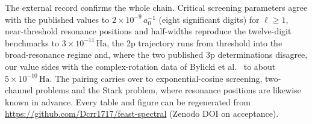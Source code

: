 \documentclass[12pt,twoside]{paper}
\newcommand{\Ha}{\,\mathrm{Ha}}
\begin{document}
The external record confirms the whole chain. Critical screening
parameters agree with the published values to $2\times10^{-9}\,a_0^{-1}$
(eight significant digits) for $\ell \ge 1$, near-threshold resonance
positions and half-widths reproduce the twelve-digit benchmarks to
$3\times10^{-11}\Ha$, the 2p trajectory runs from threshold into the
broad-resonance regime and, where the two published 3p determinations
disagree, our value sides with the complex-rotation data of Bylicki et
al.~\cite{Bylicki2007} to about $5\times10^{-10}\Ha$. The
pairing carries over to exponential-cosine screening, two-channel
problems and the Stark problem, where resonance positions are likewise
known in advance. Every table and figure can be regenerated from
\url{https://github.com/Dcrr1717/feast-spectral} (Zenodo DOI on
acceptance).


\setlength{\bibsep}{1pt}
\enlargethispage{4\baselineskip}

\end{document}
